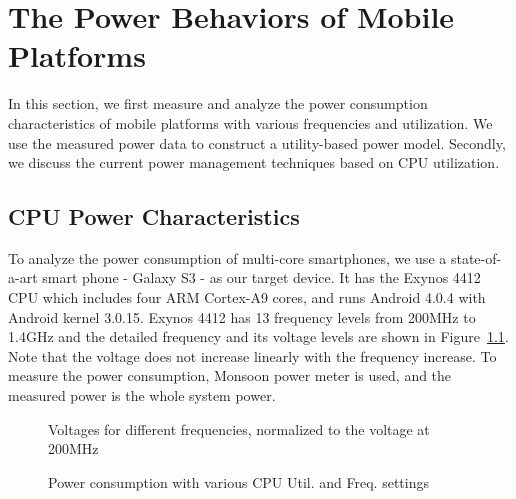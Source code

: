 \chapter{The Power Behaviors of Mobile Platforms}

In this section, we first measure and analyze the power consumption characteristics of mobile platforms with
various frequencies and utilization. We use the measured power data to construct a utility-based power model.
Secondly, we discuss the current power management techniques based on CPU utilization.

\section{CPU Power Characteristics}

To analyze the power consumption of multi-core smartphones, we use a state-of-a-art smart phone - Galaxy S3 - as our target device.
It has the Exynos 4412 CPU which includes four ARM Cortex-A9 cores, and runs Android 4.0.4 with Android kernel 3.0.15.
Exynos 4412 has 13 frequency levels from 200MHz to 1.4GHz and the detailed frequency and its voltage levels are shown in
Figure~\ref{fig:voltage}. Note that the voltage does not increase linearly with the frequency increase.
To measure the power consumption, Monsoon power meter is used, and the measured power is 
the whole system power.

\begin{figure}[bt]
\begin{center}
\vspace{-0.2in}
\end{center}
\caption{Voltages for different frequencies, normalized to the voltage at 200MHz}
\label{fig:voltage}
\end{figure}

\begin{figure}[bt]
\begin{center}
\vspace{-0.1in}
\end{center}
\caption{Power consumption with various CPU Util. and Freq. settings}
\label{fig:util_power}
\end{figure}

